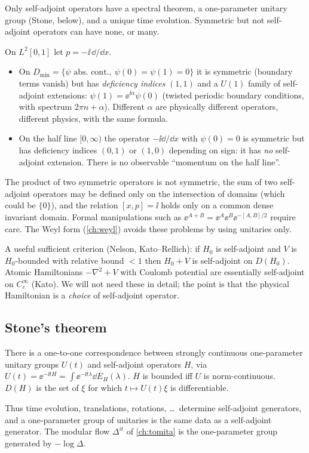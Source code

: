 Only self-adjoint operators have a spectral theorem, a one-parameter unitary group (Stone, below), and a unique time evolution. Symmetric but not self-adjoint operators can have none, or many.

\begin{example}\label{ex:interval}
On $L^2[0,1]$ let $p=-\ii\,\dd/\dd x$.
\begin{itemize}
\item On $D_{\min}=\{\psi\text{ abs.\ cont.},\ \psi(0)=\psi(1)=0\}$ it is symmetric (boundary terms vanish) but has \emph{deficiency indices} $(1,1)$ and a $U(1)$ family of self-adjoint extensions: $\psi(1)=\ee^{\ii\alpha}\psi(0)$ (twisted periodic boundary conditions, with spectrum $2\pi n+\alpha$). Different $\alpha$ are physically different operators, different physics, with the same formula.
\item On the half line $[0,\infty)$ the operator $-\ii\dd/\dd x$ with $\psi(0)=0$ is symmetric but has deficiency indices $(0,1)$ or $(1,0)$ depending on sign: it has \emph{no} self-adjoint extension. There is no observable ``momentum on the half line''.
\end{itemize}
\end{example}

\begin{whatwrong}
The product of two symmetric operators is not symmetric, the sum of two self-adjoint operators may be defined only on the intersection of domains (which could be $\{0\}$), and the relation $[x,p]=\ii$ holds only on a common dense invariant domain. Formal manipulations such as $\ee^{A+B}=\ee^A\ee^B\ee^{-[A,B]/2}$ require care. The Weyl form (\cref{ch:weyl}) avoids these problems by using unitaries only.
\end{whatwrong}

A useful sufficient criterion (Nelson, Kato--Rellich): if $H_0$ is self-adjoint and $V$ is $H_0$-bounded with relative bound $<1$ then $H_0+V$ is self-adjoint on $D(H_0)$. Atomic Hamiltonians $-\nabla^2+V$ with Coulomb potential are essentially self-adjoint on $C_c^\infty$ (Kato). We will not need these in detail; the point is that the physical Hamiltonian is a \emph{choice} of self-adjoint operator.

\subsection{Stone's theorem}

\begin{theorem}[Stone]
There is a one-to-one correspondence between strongly continuous one-parameter unitary groups $U(t)$ and self-adjoint operators $H$, via $U(t)=\ee^{-\ii tH}=\int\ee^{-\ii t\lambda}\dd E_H(\lambda)$. $H$ is bounded iff $U$ is norm-continuous. $D(H)$ is the set of $\xi$ for which $t\mapsto U(t)\xi$ is differentiable.
\end{theorem}
Thus time evolution, translations, rotations, \dots\ determine self-adjoint generators, and a one-parameter group of unitaries is the same data as a self-adjoint generator. The modular flow $\Delta^{it}$ of \cref{ch:tomita} is the one-parameter group generated by $-\log\Delta$.

